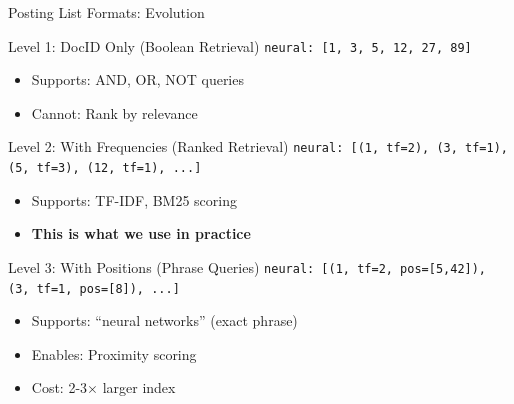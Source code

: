 \documentclass[aspectratio=169]{beamer}
\begin{document}
\begin{frame}[shrink=10]{Posting List Formats: Evolution}
\begin{block}{Level 1: DocID Only (Boolean Retrieval)}
\texttt{neural: [1, 3, 5, 12, 27, 89]}
\begin{itemize}
    \item Supports: AND, OR, NOT queries
    \item Cannot: Rank by relevance
\end{itemize}
\end{block}

\begin{block}{Level 2: With Frequencies (Ranked Retrieval)}
\texttt{neural: [(1, tf=2), (3, tf=1), (5, tf=3), (12, tf=1), ...]}
\begin{itemize}
    \item Supports: TF-IDF, BM25 scoring
    \item \textbf{This is what we use in practice}
\end{itemize}
\end{block}

\begin{block}{Level 3: With Positions (Phrase Queries)}
\texttt{neural: [(1, tf=2, pos=[5,42]), (3, tf=1, pos=[8]), ...]}
\begin{itemize}
    \item Supports: ``neural networks'' (exact phrase)
    \item Enables: Proximity scoring
    \item Cost: 2-3$\times$ larger index
\end{itemize}
\end{block}
\end{frame}
\end{document}
